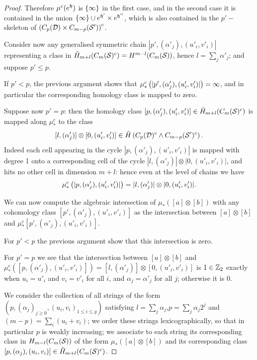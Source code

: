 \begin{proof}
Therefore
$\mu^c(e^{\mathfrak{h}})$ is $\left\{\infty\right\}$ in the first case, and in the second case it
is contained in the union $\left\{\infty\right\}\cup e^{\mathfrak{h}'}\times e^{\mathfrak{h}''}$, which is also
contained in the $p'-$skeleton of $\left(C_p(\mathcal{D})\times C_{m-p}(\mathcal{S}')\right)^c$.

% 
Consider now any generalised symmetric chain $|p',(\alpha'_j),(u'_i,v'_i)|$ representing
a class in $\tilde{H}_{m+l}(C_m(\mathcal{S})^c)=H^{m-l}(C_m(\mathcal{S}))$, hence $l=\sum_j\alpha'_j$; and suppose $p'\leq p$.

If $p'<p$, the previous argument shows that $\mu^c_*\left(|p',(\alpha'_j),(u'_i,v'_i)|\right)=\infty$,
and in particular the corresponding homology class is mapped to zero.

Suppose now $p'=p$: then the homology class $[p,(\alpha'_j),(u'_i,v'_i)]\in \tilde{H}_{m+l}(C_m(\mathcal{S})^c)$
is mapped along $\mu^c_*$ to the class
\[
[l,(\alpha'_j)]\otimes [0,(u'_i,v'_i)]\in\tilde{H}\left(C_p(\mathcal{D})^c\wedge C_{m-p}(\mathcal{S}')^c\right).
\]
Indeed each cell appearing in the cycle $|p,(\alpha'_j),(u'_i,v'_i)|$ is mapped with degree
1 onto a corresponding cell of the cycle $|l,(\alpha'_j)|\otimes |0,(u'_i,v'_i)|$, and hits no other cell
in dimension $m+l$: hence even at the level of chains we have 
\[
\mu^c_*\left(|p,(\alpha'_j),(u'_i,v'_i)|\right)=|l,(\alpha'_j)|\otimes |0,(u'_i,v'_i)|.
\]

We can now compute the algebraic intersection of $\mu_*([a]\otimes [b])$ with
any cohomology class $[p',(\alpha'_j),(u'_i,v'_i)]$ as the intersection between
$[a]\otimes [b]$ and $\mu^c_*[p',(\alpha'_j),(u'_i,v'_i)]$.

For $p'<p$ the previous argument show that this intersection is zero.

For $p'=p$ we see that the intersection between
$[a]\otimes [b]$ and $\mu^c_*([p,(\alpha'_j),(u'_i,v'_i)])=[l,(\alpha'_j)]\otimes [0,(u'_i,v'_i)]$
is $1\in\mathbb{Z}_2$ exactly when $u_i=u'_i$ and $v_i=v'_i$ for all $i$, and $\alpha_j=\alpha'_j$
for all $j$; otherwise it is $0$.

We consider the collection of all strings of the form $(p,(\alpha_j)_{j\geq 0},(u_i,v_i)_{1\leq i\leq g})$
satisfying $l=\sum_j\alpha_j$,$p=\sum_j \alpha_j2^j$ and $(m-p)=\sum_i(u_i+v_i)$;
we order these strings lexicographically,
so that in particular $p$ is weakly increasing; we associate
to each string its corresponding class in $H_{m-l}(C_m(\mathcal{S}))$ of the form $\mu_*([a]\otimes [b])$ and its
corresponding class $[p,(\alpha_j),(u_i,v_i)]\in\tilde{H}_{m+l}(C_m(\mathcal{S})^c)$.


\end{proof}
